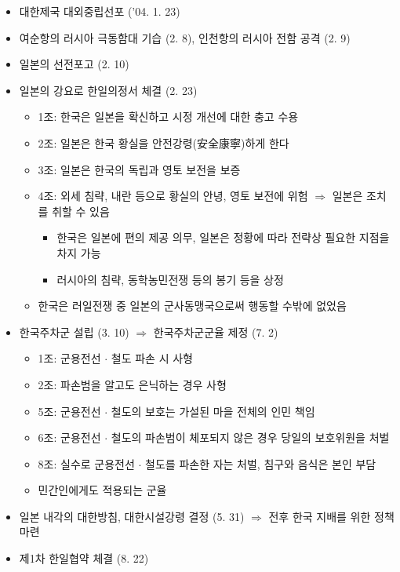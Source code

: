 \begin{itemize}
    \item 대한제국 대외중립선포 ('04. 1. 23)
    \item 여순항의 러시아 극동함대 기습 (2. 8), 인천항의 러시아 전함 공격 (2. 9)
    \item 일본의 선전포고 (2. 10)
    \item 일본의 강요로 한일의정서 체결 (2. 23)
    \begin{itemize}
        \item 1조: 한국은 일본을 확신하고 시정 개선에 대한 충고 수용
        \item 2조: 일본은 한국 황실을 안전강령(安全康寧)하게 한다
        \item 3조: 일본은 한국의 독립과 영토 보전을 보증
        \item 4조: 외세 침략, 내란 등으로 황실의 안녕, 영토 보전에 위험 $\Rightarrow$ 일본은 조치를 취할 수 있음
        \begin{itemize}
            \item 한국은 일본에 편의 제공 의무, 일본은 정황에 따라 전략상 필요한 지점을 차지 가능
            \item 러시아의 침략, 동학농민전쟁 등의 봉기 등을 상정
        \end{itemize}
        \item 한국은 러일전쟁 중 일본의 군사동맹국으로써 행동할 수밖에 없었음
    \end{itemize}
    \item 한국주차군 설립 (3. 10) $\Rightarrow$ 한국주차군군율 제정 (7. 2)
    \begin{itemize}
        \item 1조: 군용전선 $\cdot$ 철도 파손 시 사형
        \item 2조: 파손범을 알고도 은닉하는 경우 사형
        \item 5조: 군용전선 $\cdot$ 철도의 보호는 가설된 마을 전체의 인민 책임
        \item 6조: 군용전선 $\cdot$ 철도의 파손범이 체포되지 않은 경우 당일의 보호위원을 처벌
        \item 8조: 실수로 군용전선 $\cdot$ 철도를 파손한 자는 처벌, 침구와 음식은 본인 부담
        \item 민간인에게도 적용되는 군율
    \end{itemize}
    \item 일본 내각의 대한방침, 대한시설강령 결정 (5. 31) $\Rightarrow$ 전후 한국 지배를 위한 정책 마련
    \item 제1차 한일협약 체결 (8. 22)

\end{itemize}
